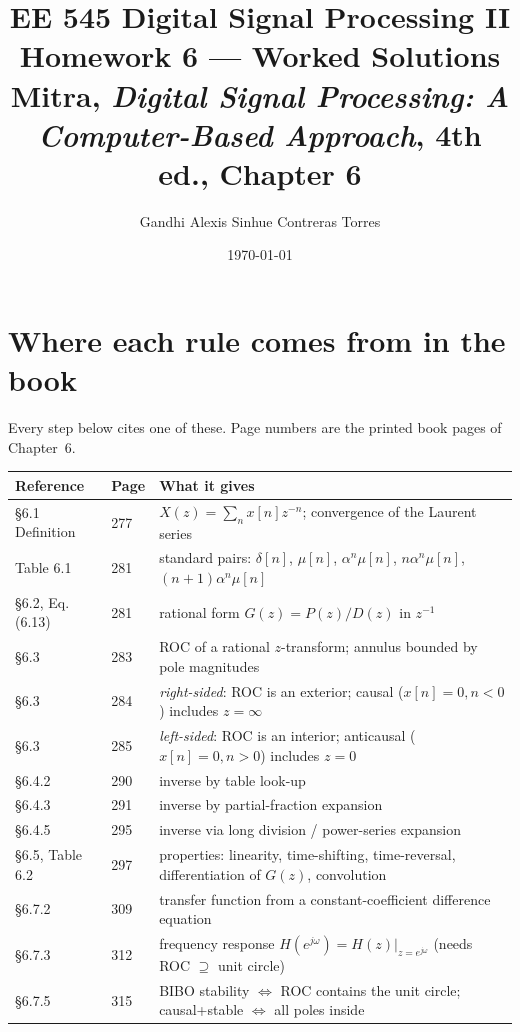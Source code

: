 \documentclass[11pt,letterpaper]{article}
\title{\vspace{-1.6cm}\bfseries EE 545 Digital Signal Processing II\\[0.3ex]
       \large Homework 6 --- Worked Solutions\\[0.3ex]
       \normalsize Mitra, \emph{Digital Signal Processing: A Computer-Based Approach}, 4th ed., Chapter 6}
\author{Gandhi Alexis Sinhue Contreras Torres}
\date{\today}
\begin{document}
\maketitle
\vspace{-1.1cm}

\section{Where each rule comes from in the book}

Every step below cites one of these. Page numbers are the printed book pages of Chapter~6.

\begin{tabularx}{\linewidth}{@{}llX@{}}
\toprule
\textbf{Reference} & \textbf{Page} & \textbf{What it gives} \\
\midrule
\S6.1 Definition & 277 & $X(z)=\sum_n x[n]z^{-n}$; convergence of the Laurent series \\
Table 6.1 & 281 & standard pairs: $\delta[n]$, $\mu[n]$, $\alpha^n\mu[n]$, $n\alpha^n\mu[n]$, $(n{+}1)\alpha^n\mu[n]$ \\
\S6.2, Eq. (6.13) & 281 & rational form $G(z)=P(z)/D(z)$ in $z^{-1}$ \\
\S6.3 & 283 & ROC of a rational $z$-transform; annulus bounded by pole magnitudes \\
\S6.3 & 284 & \emph{right-sided}: ROC is an exterior; causal ($x[n]{=}0,n{<}0$) includes $z=\infty$ \\
\S6.3 & 285 & \emph{left-sided}: ROC is an interior; anticausal ($x[n]{=}0,n{>}0$) includes $z=0$ \\
\S6.4.2 & 290 & inverse by table look-up \\
\S6.4.3 & 291 & inverse by partial-fraction expansion \\
\S6.4.5 & 295 & inverse via long division / power-series expansion \\
\S6.5, Table 6.2 & 297 & properties: linearity, time-shifting, time-reversal, differentiation of $G(z)$, convolution \\
\S6.7.2 & 309 & transfer function from a constant-coefficient difference equation \\
\S6.7.3 & 312 & frequency response $H(e^{j\omega})=H(z)|_{z=e^{j\omega}}$ (needs ROC $\supseteq$ unit circle) \\
\S6.7.5 & 315 & BIBO stability $\iff$ ROC contains the unit circle; causal+stable $\iff$ all poles inside \\
\bottomrule
\end{tabularx}
\end{document}
